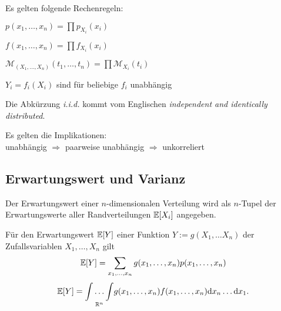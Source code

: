 \begin{note}
	Es gelten folgende Rechenregeln:
	\begin{compactenum}[i:]
		\item \(p(x_1,\ldots,x_n) = \prod p_{X_i}(x_i)\)
		\item \(	f(x_1,\ldots,x_n) = \prod f_{X_i}(x_i)\)
		\item \(\mathcal{M}_{(X_1, \ldots, X_n)}(t_1, \ldots, t_n)= \prod \mathcal{M}_{X_i}(t_i)\)
		\item \(Y_i = f_i(X_i)\) sind für beliebige \(f_i\) unabhängig
	\end{compactenum}

\end{note}

\begin{definition}[i.i.d Annahme]
	Die Abkürzung \emph{i.i.d.} kommt vom Englischen \emph{independent and identically distributed}.
\end{definition}

\begin{note}
	Es gelten die Implikationen: \\
	unabhängig	\(\Rightarrow\) paarweise unabhängig \(\Rightarrow\) unkorreliert
\end{note}


\subsection{Erwartungswert und Varianz}

\begin{note}
	Der Erwartungswert einer \(n\)-dimensionalen Verteilung wird
	als \(n\)-Tupel der Erwartungswerte aller Randverteilungen \(\mathbb{E}[X_i]\) angegeben.
\end{note}

\begin{theorem}[4.2]
	Für den Erwartungswert \(\mathbb{E}[Y]\) einer Funktion \(Y := g(X_1, \ldots X_n)\) der Zufallsvariablen \(X_1,\ldots,X_n\) gilt
	\[
		\mathbb{E}[Y] = \sum_{x_1,\ldots,x_n} g(x_1,\ldots,x_n) p(x_1,\ldots,x_n)
	\]
	\[
		\mathbb{E}[Y] = \underset{\mathbb{R}^n}{\int\ldots\int} g(x_1,\ldots,x_n)f(x_1,\ldots,x_n) \mathrm{d} x_n \ldots \mathrm{d} x_1.
	\]
\end{theorem}




